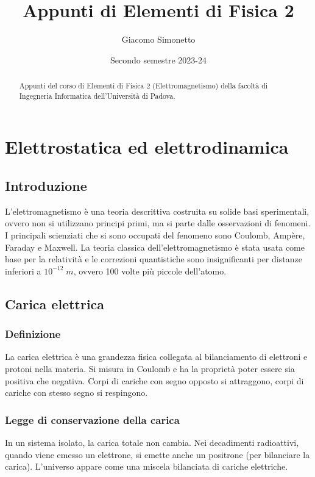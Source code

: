 \documentclass[a4paper]{article}
\title{Appunti di Elementi di Fisica 2}
\author{Giacomo Simonetto}
\date{Secondo semestre 2023-24}
\begin{document}
\maketitle
\begin{abstract}
	Appunti del corso di Elementi di Fisica 2 (Elettromagnetismo) della facoltà di Ingegneria Informatica dell'Università di Padova.
\end{abstract}

\newpage

\tableofcontents

\newpage

\section{Elettrostatica ed elettrodinamica}
\subsection{Introduzione}
L'elettromagnetismo è una teoria descrittiva costruita su solide basi sperimentali, ovvero non si utilizzano principi primi, ma
si parte dalle osservazioni di fenomeni. I principali scienziati che si sono occupati del fenomeno sono Coulomb, Ampère, Faraday
e Maxwell. La teoria classica dell'elettromagnetismo è stata usata come base per la relatività e le correzioni quantistiche sono
insignificanti per distanze inferiori a \(10^{-12} \; m\), ovvero 100 volte più piccole dell'atomo.

\subsection{Carica elettrica}
\subsubsection*{Definizione}
La carica elettrica è una grandezza fisica collegata al bilanciamento di elettroni e protoni nella materia. Si misura in Coulomb
e ha la proprietà poter essere sia positiva che negativa. Corpi di cariche con segno opposto si attraggono, corpi di cariche con
stesso segno si respingono.

\subsubsection*{Legge di conservazione della carica}
In un sistema isolato, la carica totale non cambia. Nei decadimenti radioattivi, quando viene emesso un elettrone, si emette anche
un positrone (per bilanciare la carica). L'universo appare come una miscela bilanciata di cariche elettriche.
\end{document}

